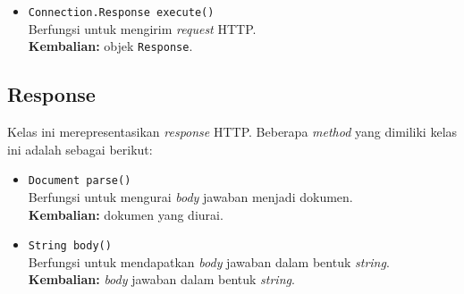 \begin{itemize}
		
		\item \texttt{Connection.Response execute()} \\
		Berfungsi untuk mengirim \textit{request} HTTP.\\
		\textbf{Kembalian:} objek \texttt{Response}.	
\end{itemize}


\subsection{Response}
Kelas ini merepresentasikan \textit{response} HTTP. Beberapa \textit{method} yang dimiliki kelas ini adalah sebagai berikut:
\begin{itemize}
		
		\item \texttt{Document parse()} \\
		Berfungsi untuk mengurai \textit{body} jawaban menjadi dokumen. \\
		\textbf{Kembalian:} dokumen yang diurai.
		
		\item \texttt{String body()} \\
		Berfungsi untuk mendapatkan \textit{body} jawaban dalam bentuk \textit{string}. \\
		\textbf{Kembalian:} \textit{body} jawaban dalam bentuk \textit{string}.
\end{itemize}


